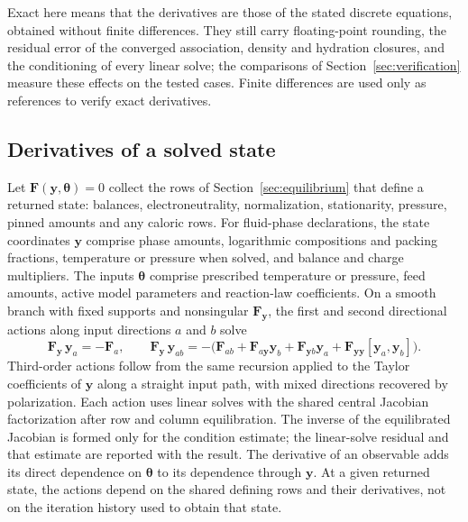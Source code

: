 Exact here means that the derivatives are those of the stated discrete equations, obtained without finite differences.
They still carry floating-point rounding, the residual error of the converged association, density and hydration closures, and the conditioning of every linear solve; the comparisons of Section~\ref{sec:verification} measure these effects on the tested cases.
Finite differences are used only as references to verify exact derivatives.

\subsection{Derivatives of a solved state}
Let $\mathbf{F}(\mathbf{y},\boldsymbol\theta)=0$ collect the rows of Section~\ref{sec:equilibrium} that define a returned state: balances, electroneutrality, normalization, stationarity, pressure, pinned amounts and any caloric rows.
For fluid-phase declarations, the state coordinates $\mathbf{y}$ comprise phase amounts, logarithmic compositions and packing fractions, temperature or pressure when solved, and balance and charge multipliers.
The inputs $\boldsymbol\theta$ comprise prescribed temperature or pressure, feed amounts, active model parameters and reaction-law coefficients.
On a smooth branch with fixed supports and nonsingular $\mathbf{F}_\mathbf{y}$, the first and second directional actions along input directions $a$ and $b$ solve~\citep{pirnayOptimalSensitivityBased2012}
\begin{equation}
\mathbf{F}_\mathbf{y}\,\mathbf{y}_a=-\mathbf{F}_a,\qquad
\mathbf{F}_\mathbf{y}\,\mathbf{y}_{ab}=-\bigl(\mathbf{F}_{ab}+\mathbf{F}_{a\mathbf{y}}\mathbf{y}_b+\mathbf{F}_{\mathbf{y}b}\mathbf{y}_a+\mathbf{F}_{\mathbf{y}\mathbf{y}}[\mathbf{y}_a,\mathbf{y}_b]\bigr).
\label{eq:solved-actions}
\end{equation}
Third-order actions follow from the same recursion applied to the Taylor coefficients of $\mathbf{y}$ along a straight input path, with mixed directions recovered by polarization.
Each action uses linear solves with the shared central Jacobian factorization after row and column equilibration.
The inverse of the equilibrated Jacobian is formed only for the condition estimate; the linear-solve residual and that estimate are reported with the result.
The derivative of an observable adds its direct dependence on $\boldsymbol\theta$ to its dependence through $\mathbf{y}$.
At a given returned state, the actions depend on the shared defining rows and their derivatives, not on the iteration history used to obtain that state.

